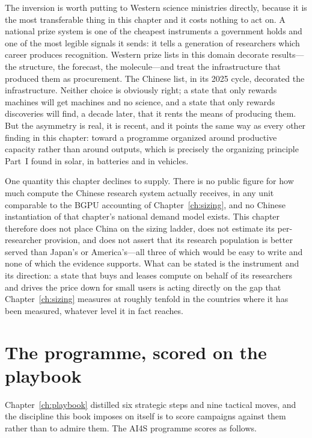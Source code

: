 The inversion is worth putting to Western science ministries directly, because it is the most transferable thing in this chapter and it costs nothing to act on. A national prize system is one of the cheapest instruments a government holds and one of the most legible signals it sends: it tells a generation of researchers which career produces recognition. Western prize lists in this domain decorate results---the structure, the forecast, the molecule---and treat the infrastructure that produced them as procurement. The Chinese list, in its 2025 cycle, decorated the infrastructure. Neither choice is obviously right; a state that only rewards machines will get machines and no science, and a state that only rewards discoveries will find, a decade later, that it rents the means of producing them. But the asymmetry is real, it is recent, and it points the same way as every other finding in this chapter: toward a programme organized around productive capacity rather than around outputs, which is precisely the organizing principle Part~I found in solar, in batteries and in vehicles.

One quantity this chapter declines to supply. There is no public figure for how much compute the Chinese research system actually receives, in any unit comparable to the BGPU accounting of Chapter~\ref{ch:sizing}, and no Chinese instantiation of that chapter's national demand model exists. This chapter therefore does not place China on the sizing ladder, does not estimate its per-researcher provision, and does not assert that its research population is better served than Japan's or America's---all three of which would be easy to write and none of which the evidence supports. What can be stated is the instrument and its direction: a state that buys and leases compute on behalf of its researchers and drives the price down for small users is acting directly on the gap that Chapter~\ref{ch:sizing} measures at roughly tenfold in the countries where it has been measured, whatever level it in fact reaches.

\section{The programme, scored on the playbook}
\label{sec:china-ai4s-playbook}

Chapter~\ref{ch:playbook} distilled six strategic steps and nine tactical moves, and the discipline this book imposes on itself is to score campaigns against them rather than to admire them. The AI4S programme scores as follows.

